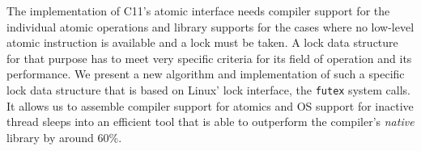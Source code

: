 The implementation of C11's atomic interface needs compiler support
for the individual atomic operations and library supports for the
cases where no low-level atomic instruction is available and a lock
must be taken. A lock data structure for that purpose has to meet
very specific criteria for its field of operation and its
performance. We present a new algorithm and implementation of such a
specific lock data structure that is based on Linux' lock interface,
the \texttt{futex} system calls. It allows us to assemble compiler support
for atomics and OS support for inactive thread sleeps into an
efficient tool that is able to outperform the compiler's \emph{native}
library by around 60\%.
